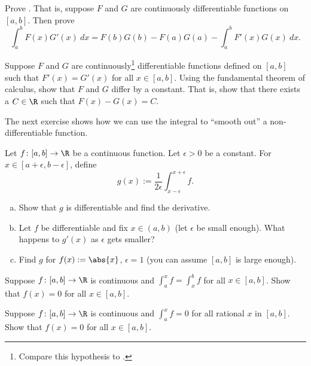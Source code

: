 \documentclass[12pt]{book}
\begin{document}
\begin{exercise}
Prove \emph{}.
That is, suppose $F$ and
$G$ are continuously differentiable functions on $[a,b]$.
Then prove
\begin{equation*}
\int_a^b F(x)G'(x)~dx
=
F(b)G(b)-F(a)G(a)
-
\int_a^b F'(x)G(x)~dx .
\end{equation*}
\end{exercise}

\begin{exercise}
Suppose $F$ and $G$ are
continuously\footnote{
Compare this hypothesis to .}
differentiable
functions defined on $[a,b]$
such that $F'(x) = G'(x)$ for all $x \in [a,b]$.
Using the fundamental theorem of calculus,
show that $F$ and $G$ differ by a constant.
That is, show that
there exists a $C \in \R$ such that
$F(x)-G(x) = C$.
\end{exercise}

\begin{exnote}
The next exercise shows how we can use the integral to ``smooth out'' a
non-differentiable function.
\end{exnote}

\begin{exercise} \label{exercise:smoothingout}
Let $f \colon [a,b] \to \R$ be a continuous function.
Let $\epsilon > 0$
be a constant.
For $x \in [a+\epsilon,b-\epsilon]$, define
\begin{equation*}
g(x) := \frac{1}{2\epsilon} \int_{x-\epsilon}^{x+\epsilon} f .
\end{equation*}
\begin{enumerate}[a)]
 \item Show that $g$ is differentiable and find the derivative.
  \item Let $f$ be differentiable and fix $x \in (a,b)$ (let $\epsilon$
be small enough).
What happens to $g'(x)$ as $\epsilon$ gets smaller?
   \item Find $g$ for $f(x) := \abs{x}$, $\epsilon = 1$ (you can assume 
$[a,b]$ is large enough).
\end{enumerate}
\end{exercise}

\begin{exercise}
Suppose $f \colon [a,b] \to \R$ is continuous and
$\int_a^x f = \int_x^b f$ for all $x \in [a,b]$.
Show that $f(x) = 0$
for all $x \in [a,b]$.
\end{exercise}

\begin{exercise}
Suppose $f \colon [a,b] \to \R$ is continuous and
$\int_a^x f = 0$ for all rational $x$ in $[a,b]$.
Show that $f(x) = 0$
for all $x \in [a,b]$.
\end{exercise}
\end{document}

